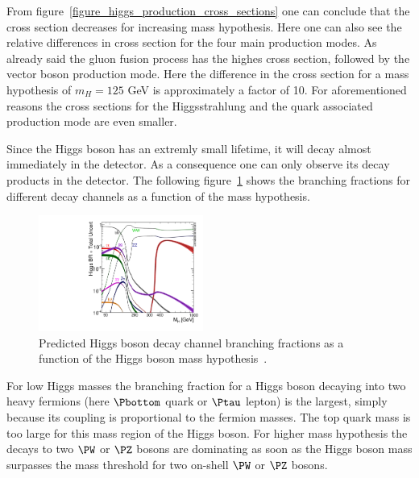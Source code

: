 From figure~\ref{figure_higgs_production_cross_sections} one can conclude that the cross section decreases for increasing mass
hypothesis. Here one can also see the relative differences in cross section for the four main production modes. As already said the
gluon fusion process has the highes cross section, followed by the vector boson production mode. Here the difference in the cross section
for a mass hypothesis of $m_H=125$ GeV is approximately a factor of 10. For aforementioned reasons the cross sections for the Higgsstrahlung and
the quark associated production mode are even smaller.

Since the Higgs boson has an extremly small lifetime, it will decay almost immediately in the detector. As a consequence one
can only observe its decay products in the detector. The following figure~\ref{figure_higgs_branching_fractions} shows the branching fractions for different decay
channels as a function of the mass hypothesis.

\begin{figure}[h]
\includegraphics[width=0.48\textwidth]{../plots/Higgs_BR.pdf}

\caption[Higgs boson decays branching fractions.]{Predicted Higgs boson decay channel branching fractions as a function of the Higgs boson mass hypothesis~\cite{yellow_report_1, yellow_report_2, yellow_report_3}.}
\label{figure_higgs_branching_fractions}
\end{figure}

For low Higgs masses the branching fraction for a Higgs boson decaying into two heavy fermions (here $\Pbottom$ quark or $\Ptau$ lepton) is the largest, simply because its coupling
is proportional to the fermion masses. The top quark mass is too large for this mass region of the Higgs boson. For higher mass hypothesis the decays to two $\PW$ or $\PZ$ bosons are
dominating as soon as the Higgs boson mass surpasses the mass threshold for two on-shell $\PW$ or $\PZ$ bosons.

